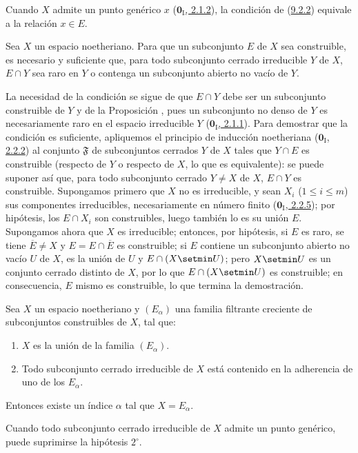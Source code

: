 Cuando $X$ admite un punto genérico $x$
(\hyperref[0.2.1.2-fr]{$\mathbf{0}_{\mathrm I}$, 2.1.2}), la condición de (\hyperref[0.9.2.2-fr]{9.2.2}) equivale a la relación $x\in E$.

\begin{proposition}[9.2.3]
\label{0.9.2.3}
\label{0.9.2.3-fr}
Sea $X$ un espacio noetheriano.
Para que un subconjunto $E$ de $X$ sea construible, es necesario y suficiente que, para todo subconjunto cerrado irreducible $Y$ de $X$, $E\cap Y$ sea raro en $Y$ o contenga un subconjunto abierto no vacío de $Y$.
\end{proposition}


La necesidad de la condición se sigue de que $E\cap Y$ debe ser un subconjunto construible de $Y$ y de la Proposición , pues un subconjunto no denso de $Y$ es necesariamente raro en el espacio irreducible $Y$ (\hyperref[0.2.1.1-fr]{$\mathbf{0}_{\mathrm I}$, 2.1.1}). Para demostrar que la condición es suficiente, apliquemos el principio de inducción noetheriana (\hyperref[0.2.2.2-fr]{$\mathbf{0}_{\mathrm I}$, 2.2.2}) al conjunto
$\mathfrak{F}$ de subconjuntos cerrados $Y$ de $X$ tales que $Y\cap E$ es construible (respecto de $Y$ o respecto de $X$, lo que es equivalente): se puede suponer así que, para todo subconjunto cerrado $Y\ne X$ de $X$, $E\cap Y$ es construible.
Supongamos primero que $X$ no es irreducible, y sean $X_i$ ($1\leq i\leq m$) sus componentes irreducibles, necesariamente en número finito (\hyperref[0.2.2.5-fr]{$\mathbf{0}_{\mathrm I}$, 2.2.5}); por hipótesis, los
$E\cap X_i$ son construibles, luego también lo es su unión $E$.
Supongamos ahora que $X$ es irreducible; entonces, por hipótesis, si $E$ es raro, se tiene $\overline{E}\ne X$ y $E=E\cap\overline{E}$ es construible; si $E$ contiene un subconjunto abierto no vacío $U$ de $X$, es la unión de $U$ y $E\cap(X\setmin U)$; pero $X\setmin U$ es un conjunto cerrado distinto de $X$, por lo que $E\cap(X\setmin U)$ es construible; en consecuencia, $E$ mismo es construible, lo que termina la demostración.


\begin{corollary}[9.2.4]
\label{0.9.2.4}
\label{0.9.2.4-fr}
Sea $X$ un espacio noetheriano y $(E_\alpha)$ una familia filtrante creciente de subconjuntos construibles de $X$, tal que:
\begin{enumerate}
  \item[$1^\circ$] $X$ es la unión de la familia $(E_\alpha)$.
  \item[$2^\circ$] Todo subconjunto cerrado irreducible de $X$ está contenido en la adherencia de uno de los $E_\alpha$.
\end{enumerate}

Entonces existe un índice $\alpha$ tal que $X=E_\alpha$.

Cuando todo subconjunto cerrado irreducible de $X$ admite un punto genérico, puede suprimirse la hipótesis $2^\circ$.
\end{corollary}

